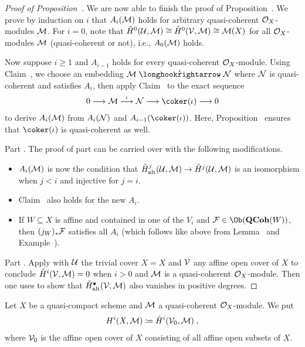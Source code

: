 \documentclass[a4paper,parskip=half,numbers=enddot, DIV=12]{scrreprt}
\renewcommand{\geq}{\geqslant}
\begin{document}
\begin{proof}[Proof of Proposition~]
	We are now able to finish the proof of Proposition~. We prove by induction on $i$ that $A_i(\mathcal{M})$ holds for arbitrary quasi-coherent $\mathcal{O}_X$-modules $\mathcal{M}$.  For $i=0$, note that $\check{H}^0(\mathcal{U},\mathcal{M})\cong \check{H}^0(\mathcal{V},\mathcal{M})\cong \mathcal{M}(X)$ for all $\mathcal{O}_X$-modules $\mathcal{M}$ (quasi-coherent or not), i.e., $A_0(\mathcal{M})$ holds. 
	
	Now suppose $i\geq 1$ and $A_{i-1}$ holds for every quasi-coherent $\mathcal{O}_X$-module. Using Claim~, we choose an embedding $\Mm\monomorphism[\iota]\Nn$ where $\mathcal{N}$ is quasi-coherent and satisfies $A_i$, then apply Claim~ to the exact sequence
	\begin{align*}
		0\morphism\Mm\morphism[\iota]\Nn\morphism\coker(\iota)\morphism 0
	\end{align*}
	to derive $A_i(\mathcal{M})$ from $A_i(\mathcal{N})$ and $A_{i-1}(\coker(\iota))$. Here, Proposition~ ensures that $\coker(\iota)$ is quasi-coherent as well.
	
	Part . The proof of part  can be carried over with the following modifications.
	\begin{itemize}
		\item $A_i(\mathcal{M})$ is now the condition that $\check{H}_\alt^j(\Uu,\Mm)\morphism \check{H}^j(\Uu,\Mm)$ is an isomorphism when $j<i$ and injective for $j=i$.
		\item Claim~ also holds for the new $A_i$.
		\item If $W\subseteq X$ is affine and contained in one of the $V_i$ and $\Ff\in\Ob(\cat{QCoh}(W))$, then $(j_W)_*\mathcal{F}$ satisfies all $A_i$ (which follows like above from Lemma~ and Example~).
	\end{itemize}
	
	Part . Apply  with $\mathcal{U}$ the trivial cover $X=X$ and $\mathcal{V}$ any affine open cover of $X$ to conclude $\check{H}^i(\mathcal{V},\mathcal{M})=0$ when $i>0$ and $\mathcal{M}$ is a quasi-coherent $\mathcal{O}_X$-module. Then one uses  to show that $\check{H}_{\mathrm{alt}}^\bullet (\mathcal{V},\mathcal{M})$ also vanishes in positive degrees.
\end{proof}
\begin{defi}
	Let $X$ be a quasi-compact scheme and $\mathcal{M}$ a quasi-coherent $\mathcal{O}_X$-module. We put
	\begin{align*}
		H^i(X,\mathcal{M})\coloneqq \check{H}^i(\mathcal{V}_0,\mathcal{M})\;,
	\end{align*}
	where $\mathcal{V}_0$ is the affine open cover of $X$ consisting of all affine open subsets of $X$.
\end{defi}
\end{document}
